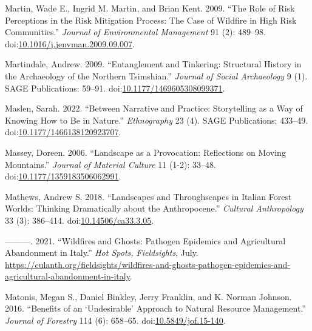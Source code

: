 \documentclass[
]{article}
\newlength{\cslhangindent}
\newenvironment{CSLReferences}[2] %
 {\begin{list}{}{%
  \setlength{\itemindent}{0pt}
  \setlength{\leftmargin}{0pt}
  \setlength{\parsep}{0pt}
  \ifodd #1
   \setlength{\leftmargin}{\cslhangindent}
   \setlength{\itemindent}{-1\cslhangindent}
  \fi
  \setlength{\itemsep}{#2\baselineskip}}}
 {\end{list}}
\begin{document}
\begin{CSLReferences}{1}{0}
Martin, Wade E., Ingrid M. Martin, and Brian Kent. 2009. {``The Role of Risk Perceptions in the Risk Mitigation Process: {The} Case of Wildfire in High Risk Communities.''} \emph{Journal of Environmental Management} 91 (2): 489--98. doi:\href{https://doi.org/10.1016/j.jenvman.2009.09.007}{10.1016/j.jenvman.2009.09.007}.

Martindale, Andrew. 2009. {``Entanglement and Tinkering: {Structural} History in the Archaeology of the {Northern Tsimshian}.''} \emph{Journal of Social Archaeology} 9 (1). SAGE Publications: 59--91. doi:\href{https://doi.org/10.1177/1469605308099371}{10.1177/1469605308099371}.

Maslen, Sarah. 2022. {``Between Narrative and Practice: {Storytelling} as a Way of Knowing How to Be in Nature.''} \emph{Ethnography} 23 (4). SAGE Publications: 433--49. doi:\href{https://doi.org/10.1177/1466138120923707}{10.1177/1466138120923707}.

Massey, Doreen. 2006. {``Landscape as a {Provocation}: {Reflections} on {Moving Mountains}.''} \emph{Journal of Material Culture} 11 (1-2): 33--48. doi:\href{https://doi.org/10.1177/1359183506062991}{10.1177/1359183506062991}.

Mathews, Andrew S. 2018. {``Landscapes and {Throughscapes} in {Italian Forest Worlds}: {Thinking Dramatically} about the {Anthropocene}.''} \emph{Cultural Anthropology} 33 (3): 386--414. doi:\href{https://doi.org/10.14506/ca33.3.05}{10.14506/ca33.3.05}.

---------. 2021. {``Wildfires and {Ghosts}: {Pathogen Epidemics} and {Agricultural Abandonment} in {Italy}.''} \emph{Hot Spots, Fieldsights}, July. \url{https://culanth.org/fieldsights/wildfires-and-ghosts-pathogen-epidemics-and-agricultural-abandonment-in-italy}.

Matonis, Megan S., Daniel Binkley, Jerry Franklin, and K. Norman Johnson. 2016. {``Benefits of an {`{Undesirable}'} {Approach} to {Natural Resource Management}.''} \emph{Journal of Forestry} 114 (6): 658--65. doi:\href{https://doi.org/10.5849/jof.15-140}{10.5849/jof.15-140}.


\end{CSLReferences}
\end{document}
